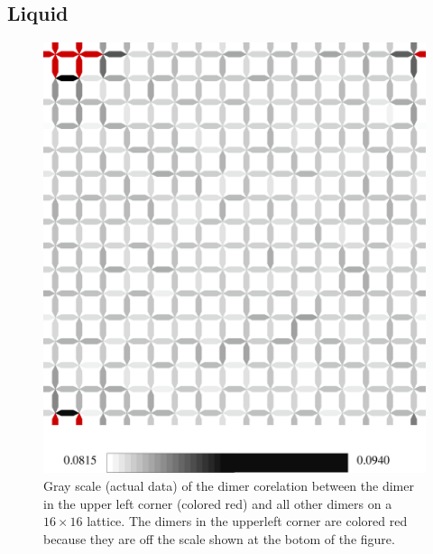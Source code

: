 \documentclass[twocolumn,prb,aps,floatfix,superscriptaddress]{revtex4-1}
\begin{document}
    \subsection{Liquid}
    \begin{figure}[htpb]
        \centering
        \includegraphics[width=0.8\linewidth]{dimer_gry_scale_qdpm.pdf}
        \caption{Gray scale (actual data) of the dimer corelation between the dimer in the upper
        left corner (colored red) and all other dimers on a $16\times16$ lattice. The 
        dimers in the upperleft corner are colored red because they are off the scale shown at the
        botom of the figure.}
        \label{fig:dimer_gry_scale_qdpm}
    \end{figure}
\end{document}
